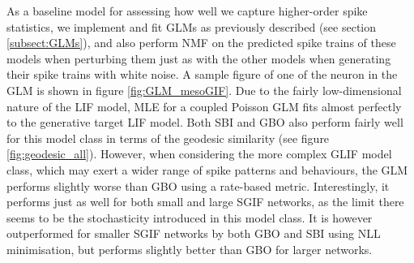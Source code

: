\documentclass[mphil,deptreport,ianc]{infthesis} %
\begin{document}
As a baseline model for assessing how well we capture higher-order spike statistics, we implement and fit GLMs as previously described (see section \ref{subsect:GLMs}), and also perform NMF on the predicted spike trains of these models when perturbing them just as with the other models when generating their spike trains with white noise.
A sample figure of one of the neuron in the GLM is shown in figure \ref{fig:GLM_mesoGIF}.
Due to the fairly low-dimensional nature of the LIF model, MLE for a coupled Poisson GLM fits almost perfectly to the generative target LIF model.
Both SBI and GBO also perform fairly well for this model class in terms of the geodesic similarity (see figure \ref{fig:geodesic_all}).
However, when considering the more complex GLIF model class, which may exert a wider range of spike patterns and behaviours, the GLM performs slightly worse than GBO using a rate-based metric.
Interestingly, it performs just as well for both small and large SGIF networks, as the limit there seems to be the stochasticity introduced in this model class.
It is however outperformed for smaller SGIF networks by both GBO and SBI using NLL minimisation, but performs slightly better than GBO for larger networks.

\end{document}

